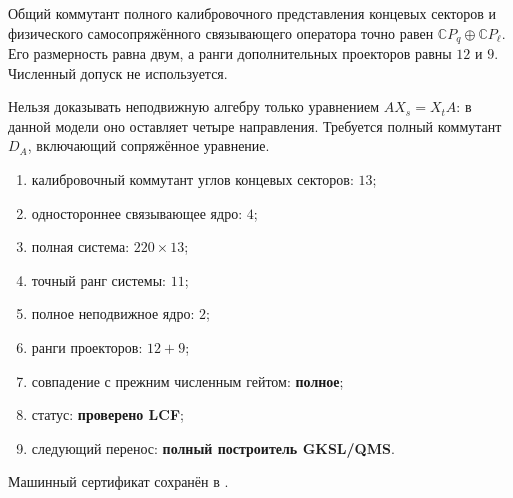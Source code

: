 \begin{theorem}
Общий коммутант полного калибровочного представления концевых секторов и физического
самосопряжённого связывающего оператора точно равен
$\mathbb CP_q\oplus\mathbb CP_\ell$. Его размерность равна двум, а ранги
дополнительных проекторов равны $12$ и $9$. Численный допуск не используется.
\end{theorem}

\begin{nogocriterion}
Нельзя доказывать неподвижную алгебру только уравнением $AX_s=X_tA$: в
данной модели оно оставляет четыре направления. Требуется полный коммутант
$D_A$, включающий сопряжённое уравнение.
\end{nogocriterion}

\begin{protocol}
\begin{enumerate}
 \item калибровочный коммутант углов концевых секторов: \textbf{$13$};
 \item одностороннее связывающее ядро: \textbf{$4$};
 \item полная система: \textbf{$220\times13$};
 \item точный ранг системы: \textbf{$11$};
 \item полное неподвижное ядро: \textbf{$2$};
 \item ранги проекторов: \textbf{$12+9$};
 \item совпадение с прежним численным гейтом: \textbf{полное};
 \item статус: \textbf{проверено LCF};
 \item следующий перенос: \textbf{полный построитель GKSL/QMS}.
\end{enumerate}
\end{protocol}

Машинный сертификат сохранён в
.